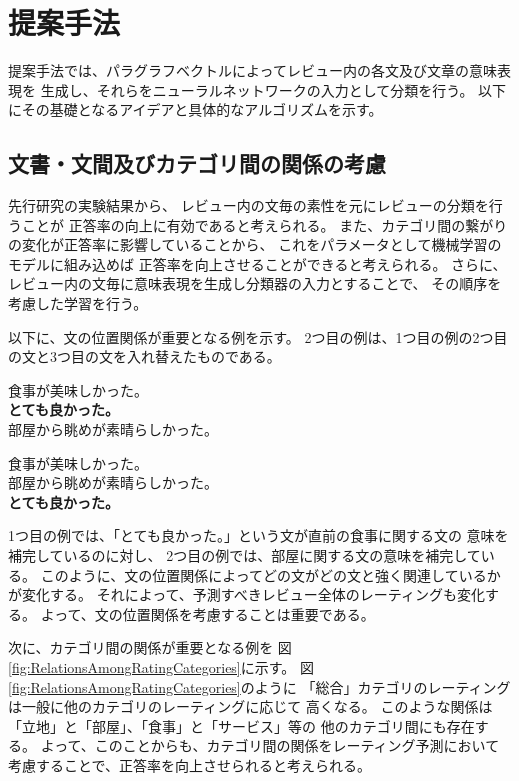 \section{提案手法} \label{sec:ProposedMethod}

提案手法では、パラグラフベクトルによってレビュー内の各文及び文章の意味表現を
生成し、それらをニューラルネットワークの入力として分類を行う。
以下にその基礎となるアイデアと具体的なアルゴリズムを示す。


\subsection{文書・文間及びカテゴリ間の関係の考慮}

先行研究\cite{fujitani15}の実験結果から、
レビュー内の文毎の素性を元にレビューの分類を行うことが
正答率の向上に有効であると考えられる。
また、カテゴリ間の繋がりの変化が正答率に影響していることから、
これをパラメータとして機械学習のモデルに組み込めば
正答率を向上させることができると考えられる。
さらに、レビュー内の文毎に意味表現を生成し分類器の入力とすることで、
その順序を考慮した学習を行う。

以下に、文の位置関係が重要となる例を示す。
2つ目の例は、1つ目の例の2つ目の文と3つ目の文を入れ替えたものである。
\begin{addmargin}{8ex}
  \vspace{1em}
  食事が美味しかった。 \\
  \textbf{とても良かった。} \\
  部屋から眺めが素晴らしかった。
\end{addmargin}
\begin{addmargin}{8ex}
  \vspace{1em}
  食事が美味しかった。 \\
  部屋から眺めが素晴らしかった。 \\
  \textbf{とても良かった。}
\end{addmargin}
1つ目の例では、「とても良かった。」という文が直前の食事に関する文の
意味を補完しているのに対し、
2つ目の例では、部屋に関する文の意味を補完している。
このように、文の位置関係によってどの文がどの文と強く関連しているかが変化する。
それによって、予測すべきレビュー全体のレーティングも変化する。
よって、文の位置関係を考慮することは重要である。

次に、カテゴリ間の関係が重要となる例を
図\ref{fig:RelationsAmongRatingCategories}に示す。
図\ref{fig:RelationsAmongRatingCategories}のように
「総合」カテゴリのレーティングは一般に他のカテゴリのレーティングに応じて
高くなる。
このような関係は「立地」と「部屋」、「食事」と「サービス」等の
他のカテゴリ間にも存在する。
よって、このことからも、カテゴリ間の関係をレーティング予測において
考慮することで、正答率を向上させられると考えられる。


